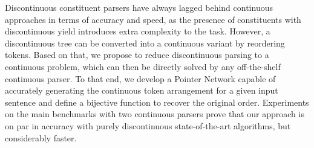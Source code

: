 Discontinuous constituent parsers have always lagged behind continuous approaches in terms of accuracy and speed, as the presence of constituents with discontinuous yield introduces extra complexity to the task. However, a discontinuous tree can be converted into a continuous variant by reordering tokens. Based on that, we propose to reduce discontinuous parsing to a continuous problem, which can then be directly solved by any off-the-shelf continuous parser. To that end, we develop a Pointer Network capable of accurately generating the continuous token arrangement for a given input sentence and define a bijective function to recover the original order. Experiments on the main benchmarks with two continuous parsers prove that our approach is on par in accuracy with purely discontinuous state-of-the-art algorithms, but considerably faster.
